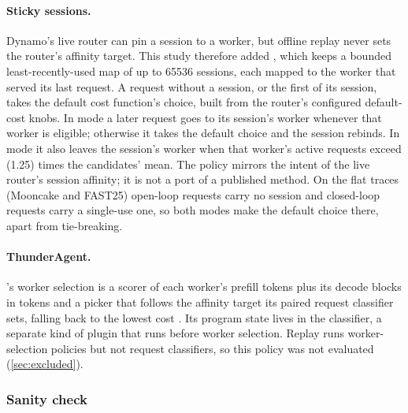 \paragraph{Sticky sessions.}
Dynamo's live router can pin a session to a worker, but offline replay never sets the router's
affinity target. This study therefore added , which keeps a bounded
least-recently-used map of up to \num{65536} sessions, each mapped to the worker that served its last
request. A request without a session, or the first of its session, takes the default cost
function's choice, built from the router's configured default-cost knobs. In  mode a
later request goes to its session's worker whenever that worker is eligible; otherwise it takes the
default choice and the session rebinds. In  mode it also leaves the session's worker
when that worker's active requests exceed  (1.25) times the candidates' mean.
The policy mirrors the intent of the live router's session affinity; it is not a port of a published
method. On the flat traces (Mooncake and FAST25) open-loop requests carry no session and
closed-loop requests carry a single-use one, so both modes make the default choice there, apart from
tie-breaking.

\paragraph{ThunderAgent.}
's worker selection is a scorer of each worker's prefill tokens plus its decode
blocks in tokens and a picker that follows the affinity target its paired request classifier sets,
falling back to the lowest cost \citep{kang2026thunderagent}. Its program state lives in the
classifier, a separate kind of plugin that runs before worker selection. Replay runs worker-selection
policies but not request classifiers, so this policy was not evaluated (\cref{sec:excluded}).

\subsubsection{Sanity check}

